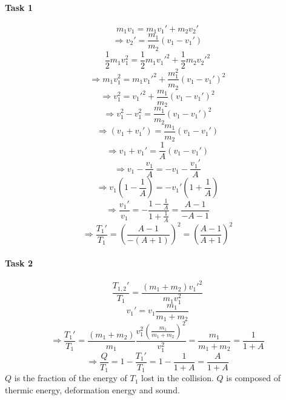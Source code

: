 \documentclass{scrreprt}
\begin{document}
\paragraph*{Task 1}
\begin{equation}
m_1v_1=m_1v_1'+m_2v_2'
\end{equation}
\begin{equation}
\Rightarrow v_2'=\frac{m_1}{m_2}(v_1-v_1')
\end{equation}
\begin{equation}
\frac{1}{2}m_1v_1^2=\frac{1}{2}m_1v_1'^2+\frac{1}{2}m_2v_2'^2
\end{equation}
\begin{equation}
\Rightarrow m_1v_1^2=m_1v_1'^2+\frac{m_1^2}{m_2}(v_1-v_1')^2
\end{equation}
\begin{equation}
\Rightarrow v_1^2=v_1'^2+\frac{m_1}{m_2}(v_1-v_1')^2
\end{equation}
\begin{equation}
\Rightarrow v_1^2-v_1^2=\frac{m_1}{m_2}(v_1-v_1')^2
\end{equation}
\begin{equation}
\Rightarrow (v_1+v_1')=\frac{m_1}{m_2}(v_1-v_1')
\end{equation}
\begin{equation}
\Rightarrow v_1+v_1'=\frac{1}{A}(v_1-v_1')
\end{equation}
\begin{equation}
\Rightarrow v_1-\frac{v_1}{A}=-v_1-\frac{v_1'}{A}
\end{equation}
\begin{equation}
\Rightarrow v_1\left(1-\frac{1}{A}\right)=-v_1'\left(1+\frac{1}{A}\right)
\end{equation}
\begin{equation}
\Rightarrow \frac{v_1'}{v_1}=-\frac{1-\frac{1}{A}}{1+\frac{1}{A}} = \frac{A-1}{-A-1}
\end{equation}
\begin{equation}
\Rightarrow \frac{T_1'}{T_1} = \left(\frac{A-1}{-(A+1)}\right)^2=\left(\frac{A-1}{A+1}\right)^2
\end{equation}

\paragraph*{Task 2}
\begin{equation}
\frac{T_{1,2}'}{T_1}=\frac{(m_1+m_2)v_1'^2}{m_1v_1^2}
\end{equation}
\begin{equation}
v_1'=v_1\frac{m_1}{m_1+m_2}
\end{equation}
\begin{equation}
\Rightarrow \frac{T_1'}{T_1}= \frac{(m_1+m_2)}{m_1}\frac{v_1^2\left(\frac{m_1}{m_1+m_2}\right)^2}{v_1^2}=\frac{m_1}{m_1+m_2}=\frac{1}{1+A}
\end{equation}
\begin{equation}
\Rightarrow \frac{Q}{T_1}=1-\frac{T_1'}{T_1}=1-\frac{1}{1+A}=\frac{A}{1+A}
\end{equation}
$Q$ is the fraction of the energy of $T_1$ lost in the collision. $Q$ is composed of thermic energy, deformation energy and sound.
\end{document}
